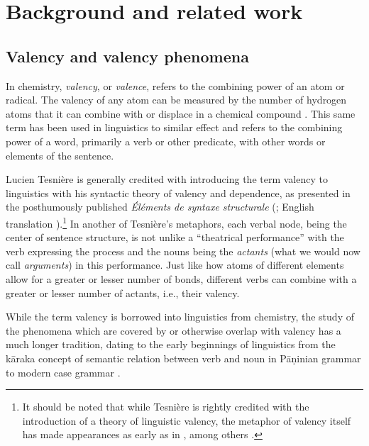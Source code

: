\section{Background and related work}\label{sec:background}

\subsection{Valency and valency phenomena}\label{subsec:valency}


In chemistry, \textit{valency}, or \textit{valence}, refers to the combining power of an atom or radical. The valency of any atom can be measured by the number of hydrogen atoms that it can combine with or displace in a chemical compound \citep{law2020a}. This same term has been used in linguistics to similar effect and refers to the combining power of a word, primarily a verb or other predicate, with other words or elements of the sentence. 

Lucien Tesnière is generally credited with introducing the term valency to linguistics with his syntactic theory of valency and dependence, as presented in the posthumously published \textit{Éléments de syntaxe structurale} (\cite*{tesniere1959}; English translation \cite*{tesniere2015}).\footnote{
    It should be noted that while Tesnière is rightly credited with the introduction of a theory of linguistic valency, the metaphor of valency itself has made appearances as early as in \citet{peirce1897}, among others \citep{przepiorkowski2018}.
}
In another of Tesnière's metaphors, each verbal node, being the center of sentence structure, is not unlike a ``theatrical performance'' with the verb expressing the process and the nouns being the \textit{actants} (what we would now call \textit{arguments}) in this performance. Just like how atoms of different elements allow for a greater or lesser number of bonds, different verbs can combine with a greater or lesser number of actants, i.e., their valency.

While the term valency is borrowed into linguistics from chemistry, the study of the phenomena which are covered by or otherwise overlap with valency has a much longer tradition, dating to the early beginnings of linguistics from the kāraka concept of semantic relation between verb and noun \citep{ganeri2011a} in Pāṇinian grammar to modern case grammar \citep{fillmore1968}. 

